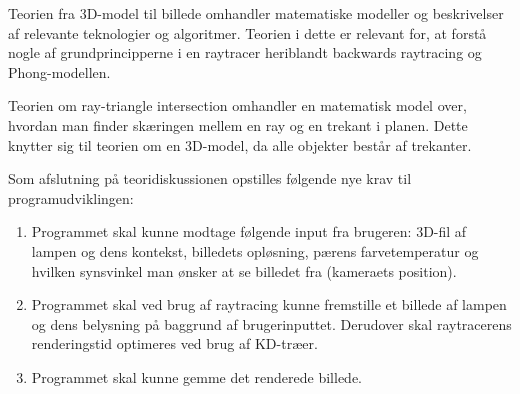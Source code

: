 Teorien fra 3D-model til billede omhandler matematiske modeller og beskrivelser af relevante teknologier og algoritmer. Teorien i dette er relevant for, at forstå nogle af grundprincipperne i en raytracer heriblandt backwards raytracing og Phong-modellen.

Teorien om ray-triangle intersection omhandler en matematisk model over, hvordan man finder skæringen mellem en ray og en trekant i planen. Dette knytter sig til teorien om en 3D-model, da alle objekter består af trekanter. 

Som afslutning på teoridiskussionen opstilles følgende nye krav til programudviklingen:
\begin{enumerate}
    \item Programmet skal kunne modtage følgende input fra brugeren: 3D-fil af lampen og dens kontekst, billedets opløsning, pærens farvetemperatur og hvilken synsvinkel man ønsker at se billedet fra (kameraets position).
    \item Programmet skal ved brug af raytracing kunne fremstille et billede af lampen og dens belysning på baggrund af brugerinputtet. Derudover skal raytracerens renderingstid optimeres ved brug af KD-træer.
    \item Programmet skal kunne gemme det renderede billede.
\end{enumerate}